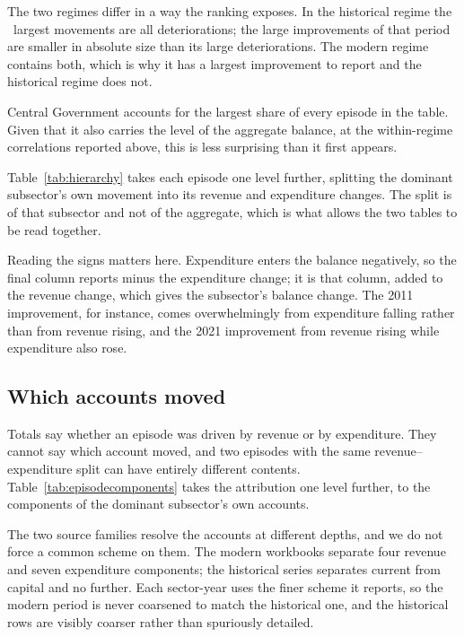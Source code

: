 The two regimes differ in a way the ranking exposes. In the historical regime the
\MovementsPerRegime\ largest movements are all deteriorations; the large improvements of
that period are smaller in absolute size than its large deteriorations. The modern regime
contains both, which is why it has a largest improvement to report and the historical
regime does not.

Central Government accounts for the largest share of every episode in the table.
Given that it also carries the level of the aggregate balance, at the within-regime
correlations reported above, this is less surprising than it first appears.

Table~\ref{tab:hierarchy} takes each episode one level further, splitting the
dominant subsector's own movement into its revenue and expenditure changes. The split
is of that subsector and not of the aggregate, which is what allows the two tables to
be read together.



Reading the signs matters here. Expenditure enters the balance negatively, so the
final column reports minus the expenditure change; it is that column, added to the
revenue change, which gives the subsector's balance change. The 2011 improvement, for
instance, comes overwhelmingly from expenditure falling rather than from revenue
rising, and the 2021 improvement from revenue rising while expenditure also rose.

\subsection{Which accounts moved}

Totals say whether an episode was driven by revenue or by expenditure. They cannot say
which account moved, and two episodes with the same revenue--expenditure split can have
entirely different contents. Table~\ref{tab:episodecomponents} takes the attribution one
level further, to the components of the dominant subsector's own accounts.

The two source families resolve the accounts at different depths, and we do not force a
common scheme on them. The modern workbooks separate four revenue and seven expenditure
components; the historical series separates current from capital and no further. Each
sector-year uses the finer scheme it reports, so the modern period is never coarsened to
match the historical one, and the historical rows are visibly coarser rather than
spuriously detailed.

